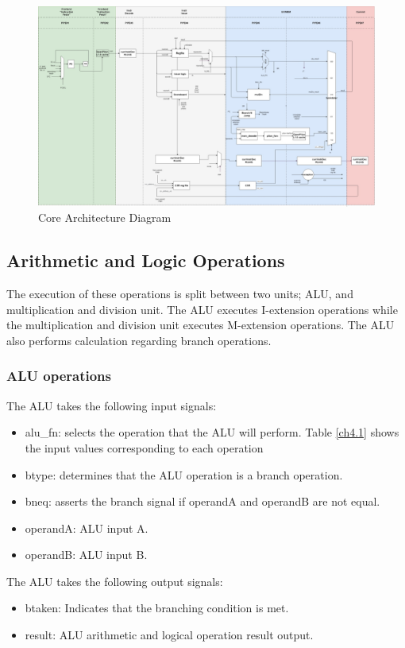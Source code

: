 \documentclass[../main.tex]{subfiles}
\begin{document}
\begin{figure}[p]
\centering
\includegraphics[scale = 0.27,angle = 90]{diagrams/CoreTopLevel.jpg}

\caption{Core Architecture Diagram}
\label{fig:img1}
\end{figure}

\subsection{Arithmetic and Logic Operations}
The execution of these operations is split between two units; ALU, and multiplication and division unit. The ALU executes I-extension operations while the multiplication and division unit executes M-extension operations. The ALU also performs calculation regarding branch operations.

\subsubsection{ALU operations}
The ALU takes the following input signals:
\begin{itemize}
  \item alu\_fn: selects the operation that the ALU will perform.
  Table \ref{ch4.1} shows the input values corresponding to each operation 
   \item btype: determines that the ALU operation is a branch operation. 
   \item bneq: asserts the branch signal if operandA and operandB are not equal.
  \item operandA: ALU input A.
  \item operandB: ALU input B.
\end{itemize}

\noindent The ALU takes the following output signals:
\begin{itemize}
  \item btaken: Indicates that the branching condition is met.
  \item result: ALU arithmetic and logical operation result output.
\end{itemize}
\end{document}
